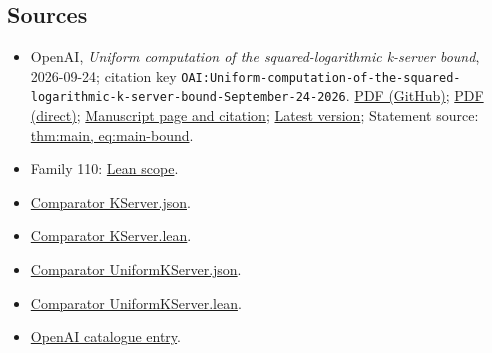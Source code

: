 \documentclass[11pt]{article}
\begin{document}
\subsection{Sources}
\begin{itemize}
\item OpenAI, \emph{Uniform computation of the squared-logarithmic k-server bound}, 2026-09-24; citation key \texttt{OAI:Uniform-computation-of-the-squared-logarithmic-k-server-bound-September-24-2026}. \href{https://github.com/openai/math/blob/adc7f1241b42e322a6451854ab7e4b4c146bf78a/preprints/Uniform-computation-of-the-squared-logarithmic-k-server-bound-September-24-2026/Uniform-computation-of-the-squared-logarithmic-k-server-bound-September-24-2026.pdf}{PDF (GitHub)}; \href{https://github.com/openai/math/raw/adc7f1241b42e322a6451854ab7e4b4c146bf78a/preprints/Uniform-computation-of-the-squared-logarithmic-k-server-bound-September-24-2026/Uniform-computation-of-the-squared-logarithmic-k-server-bound-September-24-2026.pdf}{PDF (direct)}; \href{https://github.com/openai/math/blob/adc7f1241b42e322a6451854ab7e4b4c146bf78a/preprints/Uniform-computation-of-the-squared-logarithmic-k-server-bound-September-24-2026/README.md}{Manuscript page and citation}; \href{https://github.com/openai/math/blob/main/preprints/Uniform-computation-of-the-squared-logarithmic-k-server-bound-September-24-2026/Uniform-computation-of-the-squared-logarithmic-k-server-bound-September-24-2026.pdf}{Latest version}; Statement source: \href{https://github.com/openai/math/blob/adc7f1241b42e322a6451854ab7e4b4c146bf78a/preprints/Uniform-computation-of-the-squared-logarithmic-k-server-bound-September-24-2026/build/source/sections/01-introduction.tex\#L21}{thm:main, eq:main-bound}.
\item Family 110: \href{https://github.com/openai/math/blob/adc7f1241b42e322a6451854ab7e4b4c146bf78a/lean/docs/110.md}{Lean scope}.
\item \href{https://github.com/openai/math/blob/adc7f1241b42e322a6451854ab7e4b4c146bf78a/lean/ComparatorChallenges/KServer.json}{Comparator KServer.json}.
\item \href{https://github.com/openai/math/blob/adc7f1241b42e322a6451854ab7e4b4c146bf78a/lean/ComparatorChallenges/KServer.lean}{Comparator KServer.lean}.
\item \href{https://github.com/openai/math/blob/adc7f1241b42e322a6451854ab7e4b4c146bf78a/lean/ComparatorChallenges/UniformKServer.json}{Comparator UniformKServer.json}.
\item \href{https://github.com/openai/math/blob/adc7f1241b42e322a6451854ab7e4b4c146bf78a/lean/ComparatorChallenges/UniformKServer.lean}{Comparator UniformKServer.lean}.
\item \href{https://github.com/openai/math/blob/adc7f1241b42e322a6451854ab7e4b4c146bf78a/CONTENTS.md}{OpenAI catalogue entry}.
\end{itemize}
\end{document}
